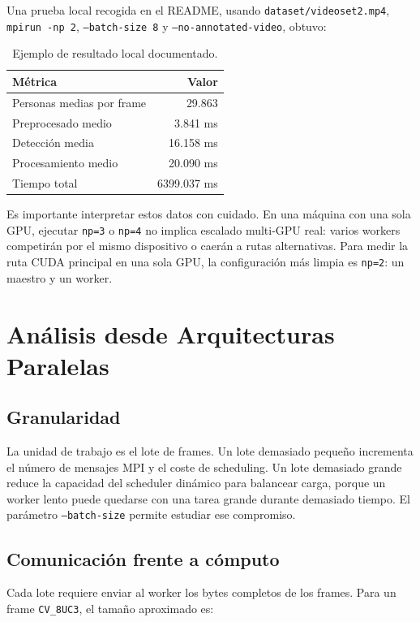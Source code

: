 \documentclass[12pt,a4paper]{article}
\begin{document}
Una prueba local recogida en el README, usando \texttt{dataset/videoset2.mp4},
\texttt{mpirun -np 2}, \texttt{--batch-size 8} y \texttt{--no-annotated-video}, obtuvo:

\begin{table}[H]
\centering
\begin{tabular}{lr}
\toprule
\textbf{M\'etrica} & \textbf{Valor} \\
\midrule
Personas medias por frame & 29.863 \\
Preprocesado medio & 3.841 ms \\
Detecci\'on media & 16.158 ms \\
Procesamiento medio & 20.090 ms \\
Tiempo total & 6399.037 ms \\
\bottomrule
\end{tabular}
\caption{Ejemplo de resultado local documentado.}
\end{table}

Es importante interpretar estos datos con cuidado. En una m\'aquina con una sola GPU, ejecutar
\texttt{np=3} o \texttt{np=4} no implica escalado multi-GPU real: varios workers competir\'an
por el mismo dispositivo o caer\'an a rutas alternativas. Para medir la ruta CUDA principal en
una sola GPU, la configuraci\'on m\'as limpia es \texttt{np=2}: un maestro y un worker.

\section{An\'alisis desde Arquitecturas Paralelas}

\subsection{Granularidad}

La unidad de trabajo es el lote de frames. Un lote demasiado peque\~no incrementa el n\'umero de
mensajes MPI y el coste de scheduling. Un lote demasiado grande reduce la capacidad del
scheduler din\'amico para balancear carga, porque un worker lento puede quedarse con una tarea
grande durante demasiado tiempo. El par\'ametro \texttt{--batch-size} permite estudiar ese
compromiso.

\subsection{Comunicaci\'on frente a c\'omputo}

Cada lote requiere enviar al worker los bytes completos de los frames. Para un frame
\texttt{CV\_8UC3}, el tama\~no aproximado es:
\end{document}
